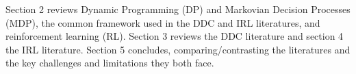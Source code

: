 Section 2 reviews Dynamic Programming (DP) and Markovian Decision Processes (MDP), the common framework
used in the DDC and IRL literatures, and reinforcement learning (RL). Section 3 reviews the DDC literature
and section 4 the IRL literature. Section 5 concludes, comparing/contrasting
the literatures and the key challenges and limitations they both face.

